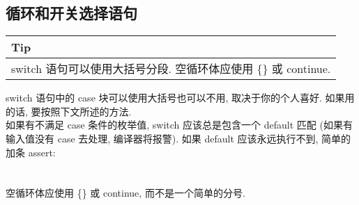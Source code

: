\documentclass[a4paper,11pt,CJK]{article}
\begin{document}
\begin{CJK}{UTF8}{gbsn}
\subsection{循环和开关选择语句}
\begin{table}[htbp]
\flushleft
\begin{tabular}{p{400pt}}
\toprule
\rowcolor[gray]{.8} Tip \\
\midrule
switch 语句可以使用大括号分段. 空循环体应使用 \{\} 或 continue.\\
\bottomrule
\end{tabular}
\end{table}
switch 语句中的 case 块可以使用大括号也可以不用, 取决于你的个人喜好. 如果用的话, 要按照下文所述的方法.\\

如果有不满足 case 条件的枚举值, switch 应该总是包含一个 default 匹配 (如果有输入值没有 case 去处理, 编译器将报警). 如果 default 应该永远执行不到, 简单的加条 assert:\\
\\
\\
\indent 空循环体应使用 \{\} 或 continue, 而不是一个简单的分号.\\

\end{CJK}
\end{document}
